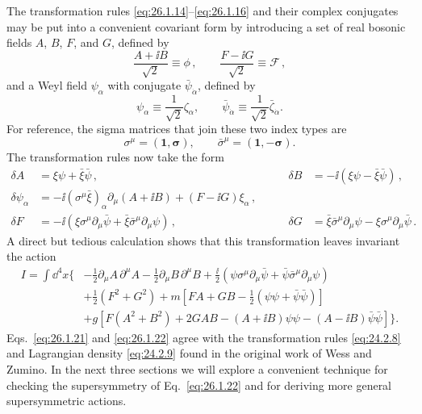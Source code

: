 The transformation rules \eqref{eq:26.1.14}--\eqref{eq:26.1.16} and their
complex conjugates may be put into a convenient covariant form by introducing
a set of real bosonic fields \(A\), \(B\), \(F\), and \(G\), defined by
\begin{equation}
  \frac{A+\ii B}{\sqrt{2}}\equiv\phi\,,
  \qquad
  \frac{F-\ii G}{\sqrt{2}}\equiv\mathcal{F}\,,
  \tag{26.1.19}\label{eq:26.1.19}
\end{equation}
and a Weyl field \(\psi_\alpha\) with conjugate
\(\bar\psi_{\dot\alpha}\), defined by
\begin{equation}
  \psi_\alpha\equiv\frac{1}{\sqrt{2}}\zeta_\alpha,
  \qquad
  \bar\psi_{\dot\alpha}\equiv
  \frac{1}{\sqrt{2}}\bar\zeta_{\dot\alpha}.
  \tag{26.1.20}\label{eq:26.1.20}
\end{equation}
For reference, the sigma matrices that join these two index types are
\[
  \sigma^\mu=(\mathbf{1},\boldsymbol{\sigma}),
  \qquad
  \bar\sigma^\mu=(\mathbf{1},-\boldsymbol{\sigma}) .
\]
The transformation rules now take the form
\begin{equation}
  \begin{aligned}
    \delta A&=\xi\psi+\bar\xi\bar\psi\,,
    &\qquad
    \delta B&=-\ii(\xi\psi-\bar\xi\bar\psi)\,,
    \\
    \delta\psi_\alpha
    &=-\ii(\sigma^\mu\bar\xi)_\alpha\partial_\mu(A+\ii B)
      +(F-\ii G)\xi_\alpha\,,
    \\
    \delta F&=-\ii\left(
      \xi\sigma^\mu\partial_\mu\bar\psi
      +\bar\xi\bar\sigma^\mu\partial_\mu\psi\right)\,,
    &\qquad
    \delta G&=\bar\xi\bar\sigma^\mu\partial_\mu\psi
      -\xi\sigma^\mu\partial_\mu\bar\psi\,.
  \end{aligned}
  \tag{26.1.21}\label{eq:26.1.21}
\end{equation}
A direct but tedious calculation shows that this transformation leaves
invariant the action
\begin{equation}
  \begin{aligned}
  I=\int \dd^4x\biggl\{
    &-\frac12\partial_\mu A\,\partial^\mu A
     -\frac12\partial_\mu B\,\partial^\mu B
     +\frac{\ii}{2}\left(
       \psi\sigma^\mu\partial_\mu\bar\psi
       +\bar\psi\bar\sigma^\mu\partial_\mu\psi\right)
  \\
    &+\frac12(F^2+G^2)
     +m\left[FA+GB-\frac12(\psi\psi+\bar\psi\bar\psi)\right]
  \\
    &+g\left[F(A^2+B^2)+2GAB
      -(A+\ii B)\psi\psi-(A-\ii B)\bar\psi\bar\psi\right]\biggr\}.
  \end{aligned}
  \tag{26.1.22}\label{eq:26.1.22}
\end{equation}
Eqs.~\eqref{eq:26.1.21} and \eqref{eq:26.1.22} agree with the transformation
rules \eqref{eq:24.2.8} and Lagrangian density \eqref{eq:24.2.9} found in the
original work of Wess and Zumino. In the next three sections we will explore a
convenient technique for checking the supersymmetry of
Eq.~\eqref{eq:26.1.22} and for deriving more general supersymmetric actions.

